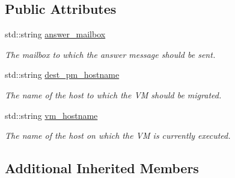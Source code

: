 \subsection*{Public Attributes}
\begin{DoxyCompactItemize}
\item 
\mbox{\label{classwrench_1_1_virtualized_cluster_service_migrate_v_m_request_message_a9449ff3a2414dde3d6ea532a10e147c1}} 
std\+::string \hyperlink{classwrench_1_1_virtualized_cluster_service_migrate_v_m_request_message_a9449ff3a2414dde3d6ea532a10e147c1}{answer\+\_\+mailbox}
\begin{DoxyCompactList}\small\item\em The mailbox to which the answer message should be sent. \end{DoxyCompactList}\item 
\mbox{\label{classwrench_1_1_virtualized_cluster_service_migrate_v_m_request_message_ab96c54b2db8ff4de71f99b72b442cffd}} 
std\+::string \hyperlink{classwrench_1_1_virtualized_cluster_service_migrate_v_m_request_message_ab96c54b2db8ff4de71f99b72b442cffd}{dest\+\_\+pm\+\_\+hostname}
\begin{DoxyCompactList}\small\item\em The name of the host to which the VM should be migrated. \end{DoxyCompactList}\item 
\mbox{\label{classwrench_1_1_virtualized_cluster_service_migrate_v_m_request_message_ace7cf886213ce713432360e68ed9f494}} 
std\+::string \hyperlink{classwrench_1_1_virtualized_cluster_service_migrate_v_m_request_message_ace7cf886213ce713432360e68ed9f494}{vm\+\_\+hostname}
\begin{DoxyCompactList}\small\item\em The name of the host on which the VM is currently executed. \end{DoxyCompactList}\end{DoxyCompactItemize}
\subsection*{Additional Inherited Members}


